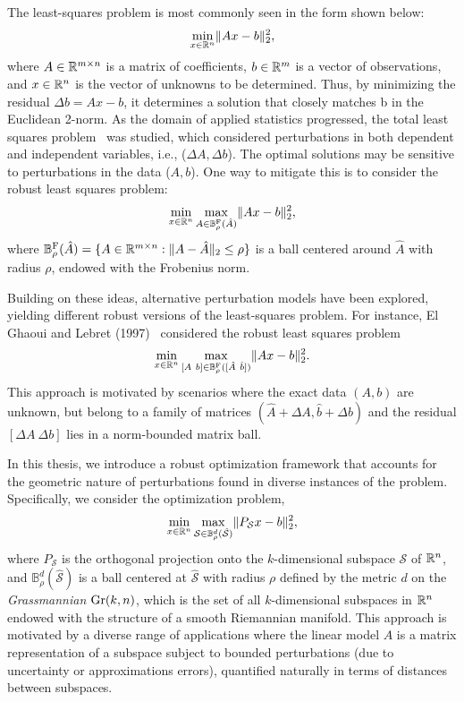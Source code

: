 The least-squares problem is most commonly seen in the form shown below:
\begin{equation}
    \min_{x \in \mathbb{R}^n} \lVert A x - b \rVert_2^2,
\end{equation}
where $A \in \mathbb{R}^{m \times n}$ is a matrix of coefficients, $b \in \mathbb{R}^m$ is a vector of observations, and $x \in \mathbb{R}^n$ is the vector of unknowns to be determined. Thus, by minimizing the residual $\Delta b = A x - b$, it determines a solution that closely matches b in the Euclidean 2-norm. As the domain of applied statistics progressed, the total least squares problem~\cite{golub1980} was studied, which considered perturbations in both dependent and independent variables, i.e., ($\Delta A, \Delta b$). The optimal solutions may be sensitive to perturbations in the data ($A, b$). One way to mitigate this is to consider the robust least squares problem:
\begin{equation}
    \min_{x \in \mathbb{R}^n} \max_{A \in \mathbb{B}^{\textrm{F}}_{\rho}(\hat{A})} \lVert Ax - b \rVert_2^2,
\end{equation}
where $\mathbb{B}_{\rho}^{\mathrm{F}}(\hat{A}) = \{ A \in \mathbb{R}^{m \times n} : \lVert A - \hat{A} \rVert_2 \leq \rho \}$ is a ball centered around $\hat{A}$ with radius $\rho$, endowed with the Frobenius norm. 

Building on these ideas, alternative perturbation models have been explored, yielding different robust versions of the least-squares problem. For instance, El Ghaoui and Lebret (1997)~\cite{ghaoui97} considered the robust least squares problem
\begin{equation}
    \min_{x \in \mathbb{R}^n} \max_{[A \ b] \in \mathbb{B}^{\textrm{F}}_{\rho}([\hat{A} \ \hat{b}])} \lVert Ax - b \rVert_2^2.
\end{equation}
This approach is motivated by scenarios where the exact data $(A,b)$ are unknown, but belong to a family of matrices $(\hat{A} + \Delta A , \hat{b} + \Delta b)$ and the residual $[\Delta A \ \Delta b]$ lies in a norm-bounded matrix ball.

In this thesis, we introduce a robust optimization framework that accounts for the geometric nature of perturbations found in diverse instances of the problem. Specifically, we consider the optimization problem,
\begin{equation}
    \min_{x \in \mathbb{R}^n} \max_{\mathcal{S} \in \mathbb{B}^d_{\rho}(\hat{\mathcal{S}})} \lVert P_{\mathcal{S}} x - b \rVert_2^2,
\end{equation}
where $P_{\mathcal{S}}$ is the orthogonal projection onto the $k$-dimensional subspace $\mathcal{S}$ of $\mathbb{R}^n$, and $\mathbb{B}^d_{\rho}(\hat{\mathcal{S}})$ is a ball centered at $\hat{\mathcal{S}}$ with radius $\rho$ defined by the metric $d$ on the \textit{Grassmannian} $\text{Gr}(k,n)$, which is  the set of all $k$-dimensional subspaces in $\mathbb{R}^n$ endowed with the structure of a smooth Riemannian manifold. This approach is motivated by a diverse range of applications where the linear model $A$ is a matrix representation of a subspace subject to bounded perturbations (due to uncertainty or approximations errors), quantified naturally in terms of distances between subspaces.

